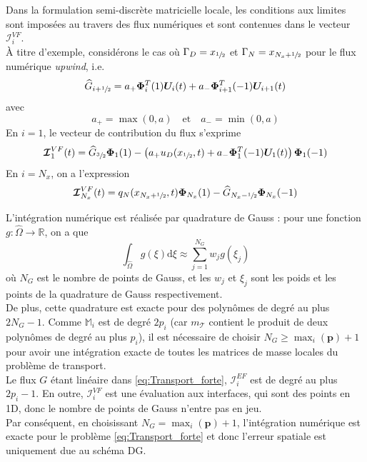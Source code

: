 \documentclass[11pt, a4paper, oneside]{report}
\begin{document}
\begin{appendices}
Dans la formulation semi-discrète matricielle locale, les conditions aux limites sont imposées au travers des flux numériques et sont contenues dans le vecteur $\bm{\mathcal{I}}_i^{VF}$. \\
À titre d'exemple, considérons le cas où $\Gamma_D = x_{\sfrac{1}{2}}$ et $\Gamma_N = x_{N_x + \sfrac{1}{2}}$ pour le flux numérique \textit{upwind}, i.e.
\begin{equation}
    \widehat{G}_{i + \sfrac{1}{2}} = a_+ \bm{\Phi}_i^T(1) \bm{U}_i(t) + a_- \bm{\Phi}_{i+1}^T(-1) \bm{U}_{i+1}(t)
\end{equation}
avec
\begin{equation}
    a_+ = \max(0, a) \quad \text{et} \quad a_- = \min(0, a)
\end{equation}
En $i = 1$, le vecteur de contribution du flux s'exprime
\begin{equation}
    \bm{\mathcal{I}}_1^{VF}(t) = \widehat{G}_{\sfrac{3}{2}} \bm{\Phi}_1(1) - \left(a_+ u_D(x_{\sfrac{1}{2}}, t) + a_- \bm{\Phi}_1^T(-1) \bm{U}_1(t) \right) \bm{\Phi}_1(-1)
\end{equation}
En $i = N_x$, on a l'expression
\begin{equation}
    \bm{\mathcal{I}}_{N_x}^{VF}(t) = q_N(x_{N_x + \sfrac{1}{2}}, t) \bm{\Phi}_{N_x}(1) - \widehat{G}_{N_x - \sfrac{1}{2}} \bm{\Phi}_{N_x}(-1)
\end{equation}

L'intégration numérique est réalisée par quadrature de Gauss : pour une fonction $g : \widehat{\Omega} \longrightarrow \mathbb{R}$, on a que
\begin{equation}
    \int_{\widehat{\Omega}} g(\xi) \text{d} \xi \approx \sum_{j = 1}^{N_G} w_j g(\xi_j)
\end{equation}
où $N_G$ est le nombre de points de Gauss, et les $w_j$ et $\xi_j$ sont les poids et les points de la quadrature de Gauss respectivement. \\
De plus, cette quadrature est exacte pour des polynômes de degré au plus $2N_G - 1$. Comme $\mathbb{M}_i$ est de degré $2p_i$ (car $m_\mathcal{T}$ contient le produit de deux polynômes de degré au plus $p_i$), il est nécessaire de choisir $N_G \geq \max_i(\mathbf{p}) + 1$ pour avoir une intégration exacte de toutes les matrices de masse locales du problème de transport. \\
Le flux $G$ étant linéaire dans \eqref{eq:Transport_forte}, $\bm{\mathcal{I}}_i^{EF}$ est de degré au plus $2p_i - 1$. En outre, $\bm{\mathcal{I}}_i^{VF}$ est une évaluation aux interfaces, qui sont des points en 1D, donc le nombre de points de Gauss n'entre pas en jeu. \\
Par conséquent, en choisissant $N_G = \max_i(\mathbf{p}) + 1$, l'intégration numérique est exacte pour le problème \eqref{eq:Transport_forte} et donc l'erreur spatiale est uniquement due au schéma DG. \\


\end{appendices}
\end{document}
